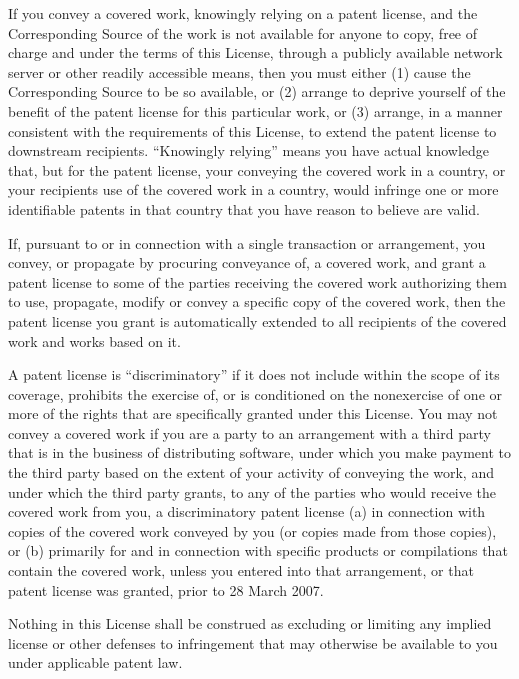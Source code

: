 \documentclass[letterpaper,10pt,english]{sphinxmanual}
\begin{document}
\begin{sphinxVerbatim}[commandchars=\\\{\}]
    If you convey a covered work, knowingly relying on a patent license, and
    the Corresponding Source of the work is not available for anyone to copy,
    free of charge and under the terms of this License, through a publicly
    available network server or other readily accessible means, then you must
    either (1) cause the Corresponding Source to be so available, or (2)
    arrange to deprive yourself of the benefit of the patent license for this
    particular work, or (3) arrange, in a manner consistent with the
    requirements of this License, to extend the patent license to downstream
    recipients. “Knowingly relying” means you have actual knowledge that, but
    for the patent license, your conveying the covered work in a country, or
    your recipient\PYGZsq{}s use of the covered work in a country, would infringe one
    or more identifiable patents in that country that you have reason to
    believe are valid.

    If, pursuant to or in connection with a single transaction or arrangement,
    you convey, or propagate by procuring conveyance of, a covered work, and
    grant a patent license to some of the parties receiving the covered work
    authorizing them to use, propagate, modify or convey a specific copy of the
    covered work, then the patent license you grant is automatically extended
    to all recipients of the covered work and works based on it.

    A patent license is “discriminatory” if it does not include within the
    scope of its coverage, prohibits the exercise of, or is conditioned on the
    non\PYGZhy{}exercise of one or more of the rights that are specifically granted
    under this License. You may not convey a covered work if you are a party to
    an arrangement with a third party that is in the business of distributing
    software, under which you make payment to the third party based on the
    extent of your activity of conveying the work, and under which the third
    party grants, to any of the parties who would receive the covered work from
    you, a discriminatory patent license (a) in connection with copies of the
    covered work conveyed by you (or copies made from those copies), or (b)
    primarily for and in connection with specific products or compilations that
    contain the covered work, unless you entered into that arrangement, or that
    patent license was granted, prior to 28 March 2007.

    Nothing in this License shall be construed as excluding or limiting any
    implied license or other defenses to infringement that may otherwise be
    available to you under applicable patent law.


\end{sphinxVerbatim}
\end{document}
